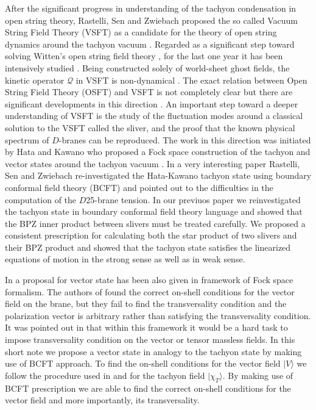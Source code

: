 \documentclass[a4paper,12pt]{article}
\begin{document}
After the significant progress in understanding of the tachyon condensation
in open string theory, Rastelli, Sen and Zwiebach proposed the so called
Vacuum String Field Theory (VSFT) as a candidate for the theory of open string
dynamics around the tachyon vacuum \cite{rsz1}. Regarded as a significant step
toward solving Witten's open string field theory \cite{w}, for the last one 
year it has been intensively studied \cite{rsz2,gt1,gt2,mt,rsz5,rsz3}. 
Being constructed solely of world-sheet ghost fields, the kinetic operator 
$\mathcal{Q}$
in VSFT  is non-dynamical \cite{rsz}. The exact relation between Open
String Field Theory (OSFT) and VSFT is not completely clear but there are 
significant developments in this direction \cite{mt,grsz,ki-oh,ok}. 
An important step toward a deeper understanding of VSFT is the study of the
fluctuation modes around  a classical solution to the VSFT called 
the sliver, and
the proof that the known physical spectrum of $D$-branes can be reproduced.
The work in this direction was initiated by Hata and Kawano who proposed a
Fock space construction of the tachyon and vector states around the
tachyon vacuum \cite{hk,hm}. In a very interesting paper \cite{rsz4} 
Rastelli, Sen and Zwiebach re-investigated the Hata-Kawano tachyon 
state using boundary conformal field theory (BCFT) and pointed out to 
the difficulties in the computation of the $D$25-brane tension.  In 
our previuos paper \cite{rv} we reinvestigated the tachyon state in 
boundary conformal field theory language and showed that the BPZ inner 
product between slivers must be treated carefully.  We proposed a 
consistent prescription for calculating both the star product of two 
slivers and their BPZ product and showed that the tachyon state 
satisfies the linearized equations of motion in the strong sense as 
well as in weak sense.

In \cite{hk} a proposal for vector state has been also given in framework of
Fock space formalism. The authors of \cite{hk} found the correct on-shell
conditions for the vector field on the brane, but they fail to find the
transversality condition and the polarization vector is arbitrary
rather than satisfying the transversality condition. It was pointed out in 
\cite{ki-oh} that within this framework it would be a hard task
to impose transversality condition on the vector or tensor massless fields. 
In this short note we propose a vector state in analogy to the tachyon state 
by making use of BCFT approach. To find the on-shell conditions for the vector 
field $|V\rangle$ we follow the procedure used in \cite{rsz4} and \cite{rv}
for the tachyon field $|\chi_T\rangle$. By making use of BCFT prescription
we are able to find the correct on-shell conditions for the vector field and
more importantly, its transversality.
\end{document}
